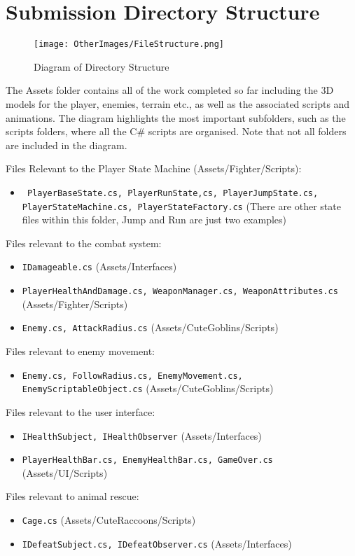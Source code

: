 \documentclass[10pt]{final_report}
\begin{document}
\newpage

\section{Submission Directory Structure}
\begin{figure}[h!]
    \centering
    \texttt{[image: OtherImages/FileStructure.png]}
    \caption{Diagram of Directory Structure}
    \label{fig:label_name2}
\end{figure}
The Assets folder contains all of the work completed so far including the 3D models for the player, enemies, terrain etc., as well as the associated scripts and animations. The diagram highlights the most important subfolders, such as the scripts folders, where all the C\# scripts are organised. Note that not all folders are included in the diagram. \newline

Files Relevant to the Player State Machine (Assets/Fighter/Scripts):
\begin{itemize}
    \item \texttt{ PlayerBaseState.cs, PlayerRunState,cs, PlayerJumpState.cs, PlayerStateMachine.cs, PlayerStateFactory.cs} (There are other state files within this folder, Jump and Run are just two examples)
\end{itemize}

Files relevant to the combat system:
\begin{itemize}
    \item \texttt{IDamageable.cs} (Assets/Interfaces)
    \item \texttt{PlayerHealthAndDamage.cs, WeaponManager.cs, WeaponAttributes.cs} (Assets/Fighter/Scripts)
    \item \texttt{Enemy.cs, AttackRadius.cs} (Assets/CuteGoblins/Scripts)
\end{itemize}
Files relevant to enemy movement:
\begin{itemize}
    \item \texttt{Enemy.cs, FollowRadius.cs, EnemyMovement.cs, EnemyScriptableObject.cs} (Assets/CuteGoblins/Scripts)
\end{itemize}
Files relevant to the user interface:
\begin{itemize}
    \item \texttt{IHealthSubject, IHealthObserver} (Assets/Interfaces)
    \item \texttt{PlayerHealthBar.cs, EnemyHealthBar.cs, GameOver.cs} (Assets/UI/Scripts)
\end{itemize}
Files relevant to animal rescue:
\begin{itemize}
    \item \texttt{Cage.cs} (Assets/CuteRaccoons/Scripts)
    \item \texttt{IDefeatSubject.cs, IDefeatObserver.cs} (Assets/Interfaces)
\end{itemize}
\end{document}
